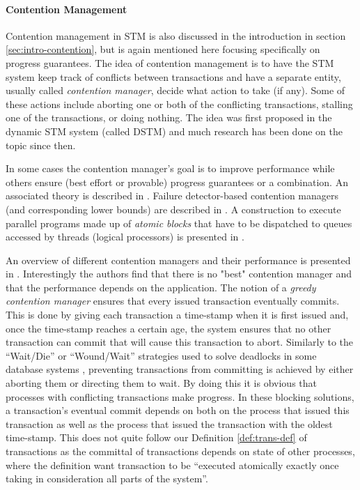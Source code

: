 \paragraph{Contention Management}
Contention management in STM is also discussed in the introduction
in section \ref{sec:intro-contention}, but is again mentioned here focusing
specifically on progress guarantees.
The idea of contention management is to have the STM system keep
track of conflicts between transactions and have a separate entity, usually
called {\it contention manager}, decide what action to take (if any). 
Some  of these  actions include  aborting one  or both  of  the conflicting
transactions, stalling one of the transactions, or doing nothing. 
The idea  was  first  proposed  in  the dynamic 
STM system (called DSTM) \cite{HLMS03} and much research has been done on the
topic since then. 

In some cases the contention manager's goal is to improve performance
while others
ensure (best effort or provable) progress guarantees or a combination. 
An associated theory is described in \cite{GHP05}. 
Failure detector-based contention managers (and corresponding 
lower bounds) are described in \cite{GKK08}. 
A construction to execute  parallel programs made up of {\it atomic blocks} 
that have to be dispatched to queues accessed by threads (logical processors) 
is presented in \cite{WF10}. 

An overview  of different contention managers and their performance is
presented  in \cite{GHP05}. Interestingly the authors find that there is no 
"best" contention manager and that the performance depends on the application. 
The notion of a {\it greedy contention manager} 
ensures that every issued transaction  eventually commits. 
This  is done  by giving  each transaction  a time-stamp  when it  is first
issued and,  once the  time-stamp reaches a  certain age, the  system ensures
that no  other transaction can commit  that will cause  this transaction to
abort.  Similarly to  the ``Wait/Die''  or ``Wound/Wait''
strategies used to solve deadlocks in some database systems  \cite{RSL78}, 
preventing  transactions from committing is  achieved by either
aborting them or directing them to wait. 
By  doing  this it  is  obvious  that  processes  with  conflicting
transactions  make progress.
In these blocking solutions, a transaction's eventual commit depends
on both on the  process that issued this transaction as well as the process
that issued the transaction  with the oldest time-stamp.
This does not quite follow our Definition \ref{def:trans-def} of transactions
as the committal of transactions depends on state of other processes,
where the definition want transaction to be ``executed atomically exactly once
taking in consideration all parts of the system''.

